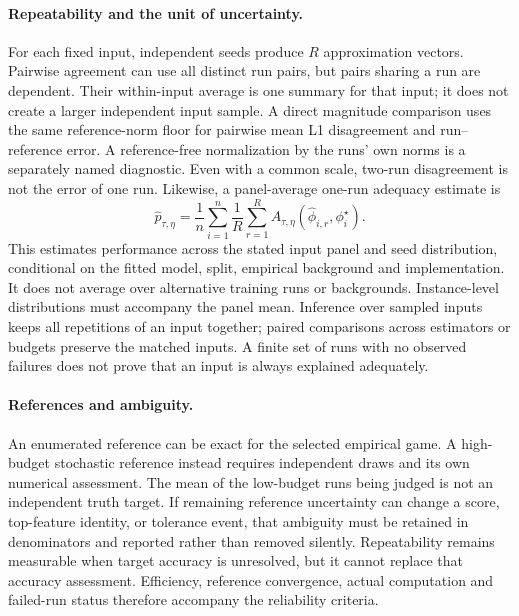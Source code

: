\paragraph{Repeatability and the unit of uncertainty.}
For each fixed input, independent seeds produce $R$ approximation vectors. Pairwise agreement can use all distinct run pairs, but pairs sharing a run are dependent. Their within-input average is one summary for that input; it does not create a larger independent input sample. A direct magnitude comparison uses the same reference-norm floor for pairwise mean L1 disagreement and run--reference error. A reference-free normalization by the runs' own norms is a separately named diagnostic. Even with a common scale, two-run disagreement is not the error of one run. Likewise, a panel-average one-run adequacy estimate is
\begin{equation}
 \widehat p_{\tau,\eta}
 =\frac{1}{n}\sum_{i=1}^{n}\frac{1}{R}
 \sum_{r=1}^{R} A_{\tau,\eta}(\widehat\phi_{i,r},\phi_i^\star).
 \label{eq:panel}
\end{equation}
This estimates performance across the stated input panel and seed distribution, conditional on the fitted model, split, empirical background and implementation. It does not average over alternative training runs or backgrounds. Instance-level distributions must accompany the panel mean. Inference over sampled inputs keeps all repetitions of an input together; paired comparisons across estimators or budgets preserve the matched inputs. A finite set of runs with no observed failures does not prove that an input is always explained adequately.

\paragraph{References and ambiguity.}
An enumerated reference can be exact for the selected empirical game. A high-budget stochastic reference instead requires independent draws and its own numerical assessment. The mean of the low-budget runs being judged is not an independent truth target. If remaining reference uncertainty can change a score, top-feature identity, or tolerance event, that ambiguity must be retained in denominators and reported rather than removed silently. Repeatability remains measurable when target accuracy is unresolved, but it cannot replace that accuracy assessment. Efficiency, reference convergence, actual computation and failed-run status therefore accompany the reliability criteria.

